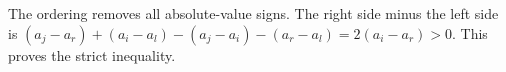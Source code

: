 The ordering removes all absolute-value signs. The right side minus the left side is $(a_j-a_r)+(a_i-a_l)-(a_j-a_i)-(a_r-a_l)=2(a_i-a_r)>0$. This proves the strict inequality.
